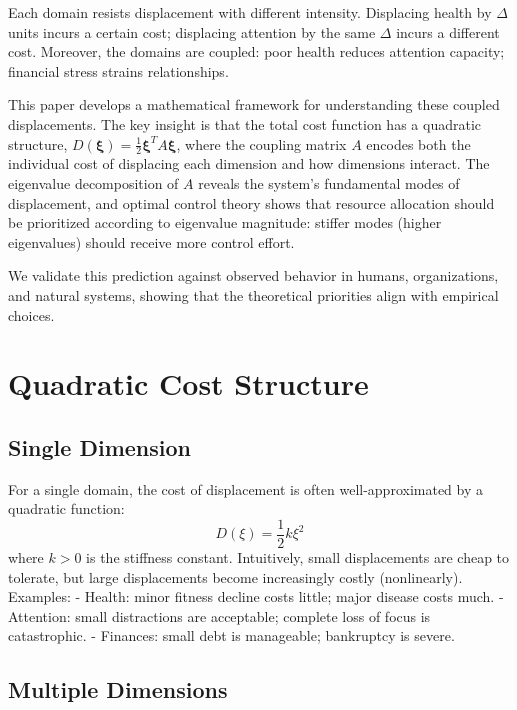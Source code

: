 \documentclass[12pt]{article}
\begin{document}
Each domain resists displacement with different intensity. Displacing health by $\Delta$ units incurs a certain cost; displacing attention by the same $\Delta$ incurs a different cost. Moreover, the domains are coupled: poor health reduces attention capacity; financial stress strains relationships.

This paper develops a mathematical framework for understanding these coupled displacements. The key insight is that the total cost function has a quadratic structure, $D(\boldsymbol{\xi}) = \frac{1}{2} \boldsymbol{\xi}^T A \boldsymbol{\xi}$, where the coupling matrix $A$ encodes both the individual cost of displacing each dimension and how dimensions interact. The eigenvalue decomposition of $A$ reveals the system's fundamental modes of displacement, and optimal control theory shows that resource allocation should be prioritized according to eigenvalue magnitude: stiffer modes (higher eigenvalues) should receive more control effort.

We validate this prediction against observed behavior in humans, organizations, and natural systems, showing that the theoretical priorities align with empirical choices.

\section{Quadratic Cost Structure}

\subsection{Single Dimension}

For a single domain, the cost of displacement is often well-approximated by a quadratic function:
\begin{equation}
D(\xi) = \frac{1}{2} k \xi^2
\end{equation}
where $k > 0$ is the stiffness constant. Intuitively, small displacements are cheap to tolerate, but large displacements become increasingly costly (nonlinearly). Examples:
- Health: minor fitness decline costs little; major disease costs much.
- Attention: small distractions are acceptable; complete loss of focus is catastrophic.
- Finances: small debt is manageable; bankruptcy is severe.

\subsection{Multiple Dimensions}
\end{document}
